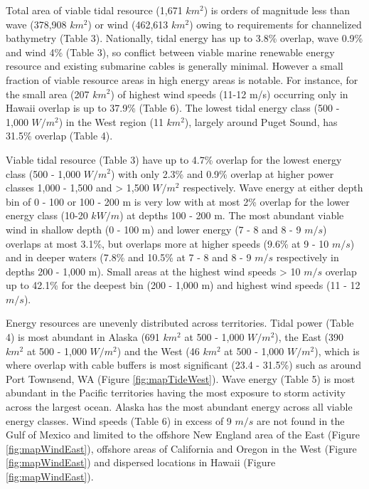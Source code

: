 \documentclass[]{article}
\begin{document}
Total area of viable tidal resource (1,671 \(km^2\)) is orders of
magnitude less than wave (378,908 \(km^2\)) or wind (462,613 \(km^2\))
owing to requirements for channelized bathymetry (Table 3). Nationally,
tidal energy has up to 3.8\% overlap, wave 0.9\% and wind 4\% (Table 3),
so conflict between viable marine renewable energy resource and existing
submarine cables is generally minimal. However a small fraction of
viable resource areas in high energy areas is notable. For instance, for
the small area (207 \(km^2\)) of highest wind speeds (11-12 m/s)
occurring only in Hawaii overlap is up to 37.9\% (Table 6). The lowest
tidal energy class (500 - 1,000 \(W/m^2\)) in the West region (11
\(km^2\)), largely around Puget Sound, has 31.5\% overlap (Table 4).

Viable tidal resource (Table 3) have up to 4.7\% overlap for the lowest
energy class (500 - 1,000 \(W/m^2\)) with only 2.3\% and 0.9\% overlap
at higher power classes 1,000 - 1,500 and \textgreater{} 1,500 \(W/m^2\)
respectively. Wave energy at either depth bin of 0 - 100 or 100 - 200 m
is very low with at most 2\% overlap for the lower energy class (10-20
\(kW/m\)) at depths 100 - 200 m. The most abundant viable wind in
shallow depth (0 - 100 m) and lower energy (7 - 8 and 8 - 9 \(m/s\))
overlaps at most 3.1\%, but overlaps more at higher speeds (9.6\% at 9 -
10 \(m/s\)) and in deeper waters (7.8\% and 10.5\% at 7 - 8 and 8 - 9
\(m/s\) respectively in depths 200 - 1,000 m). Small areas at the
highest wind speeds \textgreater{} 10 \(m/s\) overlap up to 42.1\% for
the deepest bin (200 - 1,000 m) and highest wind speeds (11 - 12
\(m/s\)).

Energy resources are unevenly distributed across territories. Tidal
power (Table 4) is most abundant in Alaska (691 \(km^2\) at 500 - 1,000
\(W/m^2\)), the East (390 \(km^2\) at 500 - 1,000 \(W/m^2\)) and the
West (46 \(km^2\) at 500 - 1,000 \(W/m^2\)), which is where overlap with
cable buffers is most significant (23.4 - 31.5\%) such as around Port
Townsend, WA (Figure \ref{fig:mapTideWest}). Wave energy (Table 5) is
most abundant in the Pacific territories having the most exposure to
storm activity across the largest ocean. Alaska has the most abundant
energy across all viable energy classes. Wind speeds (Table 6) in excess
of 9 \(m/s\) are not found in the Gulf of Mexico and limited to the
offshore New England area of the East (Figure \ref{fig:mapWindEast}),
offshore areas of California and Oregon in the West (Figure
\ref{fig:mapWindEast}) and dispersed locations in Hawaii (Figure
\ref{fig:mapWindEast}).
\end{document}
